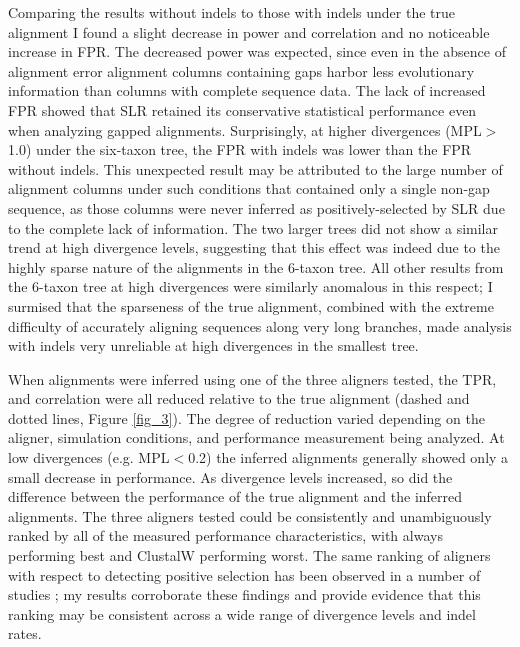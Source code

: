 Comparing the results without indels to those with indels under the
true alignment I found a slight decrease in power and \omg
correlation and no noticeable increase in FPR. The decreased power was
expected, since even in the absence of alignment error alignment
columns containing gaps harbor less evolutionary information than
columns with complete sequence data. The lack of increased FPR showed
that SLR retained its conservative statistical performance even when
analyzing gapped alignments. Surprisingly, at higher divergences (MPL$>$1.0) under the six-taxon tree, the FPR with indels was lower than
the FPR without indels. This unexpected result may be attributed to
the large number of alignment columns under such conditions that
contained only a single non-gap sequence, as those columns were never
inferred as positively-selected by SLR due to the complete lack of
information. The two larger trees did not show a similar trend at high
divergence levels, suggesting that this effect was indeed due to the
highly sparse nature of the alignments in the 6-taxon tree. All other
results from the 6-taxon tree at high divergences were similarly
anomalous in this respect; I surmised that the sparseness of the true
alignment, combined with the extreme difficulty of accurately aligning
sequences along very long branches, made \sw analysis with indels very
unreliable at high divergences in the smallest tree.

When alignments were inferred using one of the three aligners tested,
the TPR, \tpr{} and \omg correlation were all reduced relative to
the true alignment (dashed and dotted lines, Figure \ref{fig_3}). The
degree of reduction varied depending on the aligner, simulation
conditions, and performance measurement being analyzed. At low
divergences (e.g. MPL$<$0.2) the inferred alignments generally
showed only a small decrease in performance. As divergence levels
increased, so did the difference between the performance of the true
alignment and the inferred alignments. The three aligners tested could
be consistently and unambiguously ranked by all of the measured
performance characteristics, with \prankc always performing best and
ClustalW performing worst. The same ranking of aligners with respect
to detecting positive selection has been observed in a number of
studies
\citep{Fletcher2010,MarkovaRaina2011,Privman2011Improving};
my results corroborate these findings and provide evidence that this
ranking may be consistent across a wide range of divergence levels and
indel rates.

